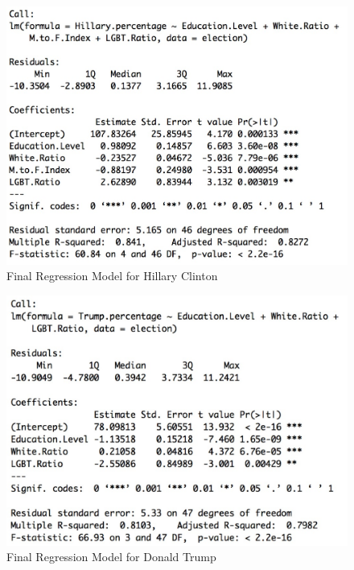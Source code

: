 \documentclass{article}
\begin{document}
{\begin{figure}[!htb]
  \centering
    \includegraphics[scale=0.3]{ClintonModel}
  \caption{Final Regression Model for Hillary Clinton}
\end{figure}

\begin{figure}[!htb]
  \centering
    \includegraphics[scale=0.3]{TrumpModel}
  \caption{Final Regression Model for Donald Trump}
\end{figure}

}
\end{document}

